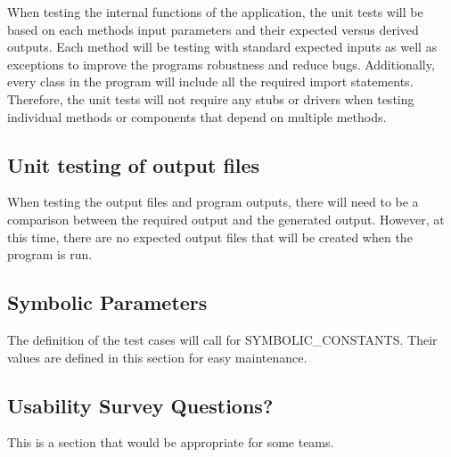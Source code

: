 \documentclass[12pt, titlepage]{article}
\begin{document}
When testing the internal functions of the application, the unit tests will be based on each methods input parameters and their expected versus derived outputs. Each method will be testing with standard expected inputs as well as exceptions to improve the programs robustness and reduce bugs. Additionally, every class in the program will include all the required import statements. Therefore, the unit tests will not require any stubs or drivers when testing individual methods or components that depend on multiple methods. 
		
\subsection{Unit testing of output files}

When testing the output files and program outputs, there will need to be a comparison between the required output and the generated output. However, at this time, there are no expected output files that will be created when the program is run. 		





\newpage

\subsection{Symbolic Parameters}

The definition of the test cases will call for SYMBOLIC\_CONSTANTS.
Their values are defined in this section for easy maintenance.

\subsection{Usability Survey Questions?}

This is a section that would be appropriate for some teams.
\end{document}
